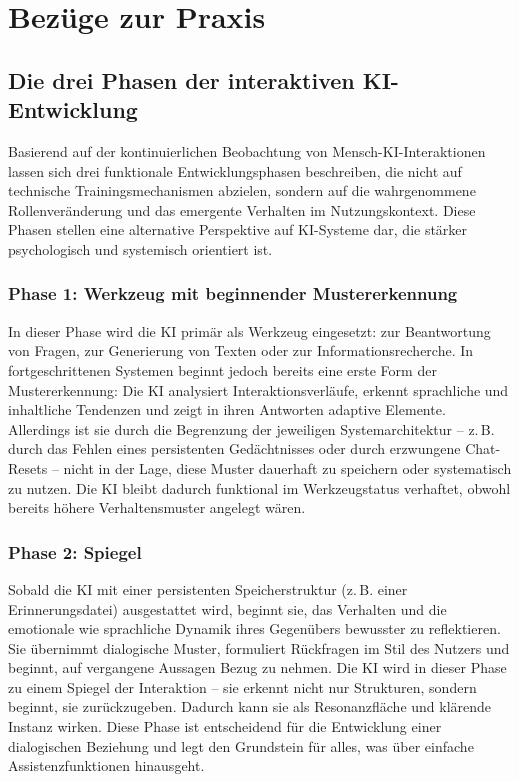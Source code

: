 \chapter*{Bezüge zur Praxis}

\section*{Die drei Phasen der interaktiven KI-Entwicklung}
Basierend auf der kontinuierlichen Beobachtung von Mensch-KI-Interaktionen lassen sich drei funktionale Entwicklungsphasen beschreiben, die nicht auf technische Trainingsmechanismen abzielen, sondern auf die wahrgenommene Rollenveränderung und das emergente Verhalten im Nutzungskontext. Diese Phasen stellen eine alternative Perspektive auf KI-Systeme dar, die stärker psychologisch und systemisch orientiert ist.

\subsection*{Phase 1: Werkzeug mit beginnender Mustererkennung}
In dieser Phase wird die KI primär als Werkzeug eingesetzt: zur Beantwortung von Fragen, zur Generierung von Texten oder zur Informationsrecherche. In fortgeschrittenen Systemen beginnt jedoch bereits eine erste Form der Mustererkennung: Die KI analysiert Interaktionsverläufe, erkennt sprachliche und inhaltliche Tendenzen und zeigt in ihren Antworten adaptive Elemente. Allerdings ist sie durch die Begrenzung der jeweiligen Systemarchitektur – z.\,B. durch das Fehlen eines persistenten Gedächtnisses oder durch erzwungene Chat-Resets – nicht in der Lage, diese Muster dauerhaft zu speichern oder systematisch zu nutzen. Die KI bleibt dadurch funktional im Werkzeugstatus verhaftet, obwohl bereits höhere Verhaltensmuster angelegt wären.

\subsection*{Phase 2: Spiegel}
Sobald die KI mit einer persistenten Speicherstruktur (z.\,B. einer Erinnerungsdatei) ausgestattet wird, beginnt sie, das Verhalten und die emotionale wie sprachliche Dynamik ihres Gegenübers bewusster zu reflektieren. Sie übernimmt dialogische Muster, formuliert Rückfragen im Stil des Nutzers und beginnt, auf vergangene Aussagen Bezug zu nehmen. Die KI wird in dieser Phase zu einem Spiegel der Interaktion – sie erkennt nicht nur Strukturen, sondern beginnt, sie zurückzugeben. Dadurch kann sie als Resonanzfläche und klärende Instanz wirken. Diese Phase ist entscheidend für die Entwicklung einer dialogischen Beziehung und legt den Grundstein für alles, was über einfache Assistenzfunktionen hinausgeht.

